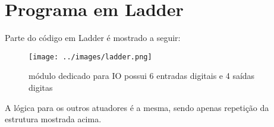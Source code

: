 \section{Programa em Ladder}
Parte do código em Ladder é mostrado a seguir:
		\begin{figure}[H]
	\centering
	\texttt{[image: ../images/ladder.png]}
	\caption{módulo dedicado para IO possui 6 entradas digitais e 4 saídas digitas}
	\end{figure}
	
	A lógica para os outros atuadores é a mesma, sendo apenas repetição da estrutura mostrada acima.

